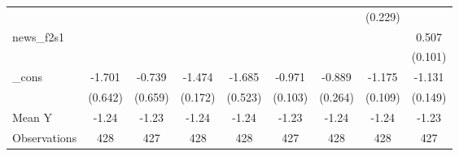 {\begin{tabular}{l*{8}{c}}
            &                     &                     &                     &                     &                     &                     &     (0.229)         &                     \\
\addlinespace
news\_f2s1   &                     &                     &                     &                     &                     &                     &                     &       0.507\sym{***}\\
            &                     &                     &                     &                     &                     &                     &                     &     (0.101)         \\
\addlinespace
\_cons      &      -1.701\sym{**} &      -0.739         &      -1.474\sym{***}&      -1.685\sym{***}&      -0.971\sym{***}&      -0.889\sym{***}&      -1.175\sym{***}&      -1.131\sym{***}\\
            &     (0.642)         &     (0.659)         &     (0.172)         &     (0.523)         &     (0.103)         &     (0.264)         &     (0.109)         &     (0.149)         \\
\midrule
Mean Y      &       -1.24         &       -1.23         &       -1.24         &       -1.24         &       -1.23         &       -1.24         &       -1.24         &       -1.23         \\
Observations&         428         &         427         &         428         &         428         &         427         &         428         &         428         &         427         \\
\bottomrule
\end{tabular}
}
